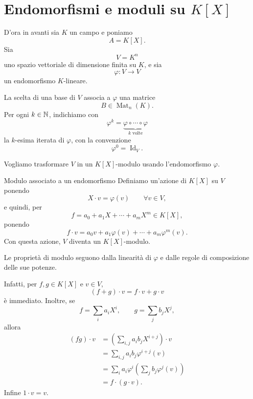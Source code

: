 \documentclass[a4paper]{article}
\begin{document}
\section{Endomorfismi e moduli su \(K[X]\)}

\begin{radioactive}
D'ora in avanti sia \(K\) un campo e poniamo
\[
    A=K[X].
\]
Sia
\[
    V=K^n
\]
uno spazio vettoriale di dimensione finita su \(K\), e sia
\[
    \varphi\colon V\to V
\]
un endomorfismo \(K\)-lineare.

La scelta di una base di \(V\) associa a \(\varphi\) una matrice
\[
    B\in\operatorname{Mat}_n(K).
\]
Per ogni \(k\in\mathbb{N}\), indichiamo con
\[
    \varphi^k=\underbrace{\varphi\circ\cdots\circ\varphi}_{k\text{ volte}}
\]
la \(k\)-esima iterata di \(\varphi\), con la convenzione
\[
    \varphi^0=\operatorname{Id}_V.
\]

Vogliamo trasformare \(V\) in un \(K[X]\)-modulo usando l'endomorfismo \(\varphi\).
\end{radioactive}

\begin{radioactive}
\begin{snippetdefinition}{Modulo associato a un endomorfismo}
    Definiamo un'azione di \(K[X]\) su \(V\) ponendo
    \[
        X\cdot v=\varphi(v)
        \qquad
        \forall v\in V,
    \]
    e quindi, per
    \[
        f=a_0+a_1X+\cdots+a_mX^m\in K[X],
    \]
    ponendo
    \[
        f\cdot v
        =
        a_0v+a_1\varphi(v)+\cdots+a_m\varphi^m(v).
    \]
    Con questa azione, \(V\) diventa un \(K[X]\)-modulo.
\end{snippetdefinition}
\end{radioactive}

\begin{radioactive}
\begin{snippetproof}{}
    Le proprietà di modulo seguono dalla linearità di \(\varphi\) e dalle regole di composizione delle sue potenze.

    Infatti, per \(f,g\in K[X]\) e \(v\in V\),
    \[
        (f+g)\cdot v=f\cdot v+g\cdot v
    \]
    è immediato. Inoltre, se
    \[
        f=\sum_i a_iX^i,
        \qquad
        g=\sum_j b_jX^j,
    \]
    allora
    \begin{align*}
        (fg)\cdot v
        &=
        \left(\sum_{i,j}a_ib_jX^{i+j}\right)\cdot v \\
        &=
        \sum_{i,j}a_ib_j\varphi^{i+j}(v) \\
        &=
        \sum_i a_i\varphi^i\left(\sum_j b_j\varphi^j(v)\right) \\
        &=
        f\cdot(g\cdot v).
    \end{align*}
    Infine \(1\cdot v=v\).
\end{snippetproof}
\end{radioactive}
\end{document}
